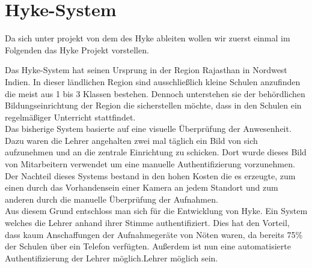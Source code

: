 \section{Hyke-System}
\label{hyke}

Da sich unter projekt von dem des Hyke ableiten wollen wir zuerst einmal im Folgenden das Hyke Projekt vorstellen.

Das Hyke-System hat seinen Ursprung in der Region Rajasthan in Nordwest Indien. In dieser ländlichen Region sind ausschließlich kleine Schulen anzufinden die meist aus 1 bis 3 Klassen bestehen. Dennoch unterstehen sie der behördlichen Bildungseinrichtung der Region die sicherstellen möchte, dass in den Schulen ein regelmäßiger Unterricht stattfindet. \\

Das bisherige System basierte auf eine visuelle Überprüfung der Anwesenheit. Dazu waren die Lehrer angehalten zwei mal täglich ein Bild von sich aufzunehmen und an die zentrale Einrichtung zu schicken. Dort wurde dieses Bild von Mitarbeitern verwendet um eine manuelle Authentifizierung vorzunehmen.
Der Nachteil dieses Systems bestand in den hohen Kosten die es erzeugte, zum einen durch das Vorhandensein einer Kamera an jedem Standort und zum anderen durch die manuelle Überprüfung der Aufnahmen.\\

Aus diesem Grund entschloss man sich für die Entwicklung von Hyke. Ein System welches die Lehrer anhand ihrer Stimme authentifiziert. Dies hat den Vorteil, dass kaum Anschaffungen der Aufnahmegeräte von Nöten waren, da bereits 75\% der Schulen über ein Telefon verfügten. Au\ss{}erdem ist nun eine automatisierte Authentifizierung der Lehrer möglich.Lehrer möglich sein.\\

